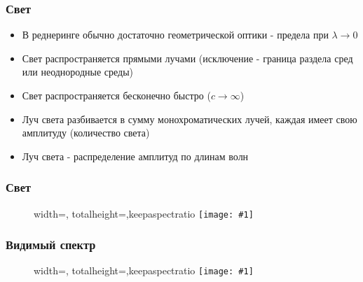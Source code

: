 \documentclass{beamer}
\newcommand{\slideimage}[1]{
  \begin{figure}
    \begin{adjustbox}{width=\textwidth, totalheight=\textheight-2\baselineskip-2\baselineskip,keepaspectratio}
      \texttt{[image: \#1]}
    \end{adjustbox}
  \end{figure}
}
\begin{document}
\begin{frame}[fragile]
\frametitle{Свет}
\begin{itemize}
\item В реднеринге обычно достаточно геометрической оптики - предела при \begin{math}\lambda\rightarrow 0\end{math}
\pause
\item Свет распространяется прямыми лучами (исключение - граница раздела сред или неоднородные среды)
\item Свет распространяется бесконечно быстро (\begin{math}c \rightarrow \infty\end{math})
\item Луч света разбивается в сумму монохроматических лучей, каждая имеет свою амплитуду (количество света)
\pause
\item Луч света - распределение амплитуд по длинам волн
\end{itemize}
\end{frame}

\begin{frame}[fragile]
\frametitle{Свет}
\slideimage{blue-red-spectrum.png}
\end{frame}

\begin{frame}[fragile]
\frametitle{Видимый спектр}
\slideimage{visible-spectrum.jpg}
\end{frame}
\end{document}
